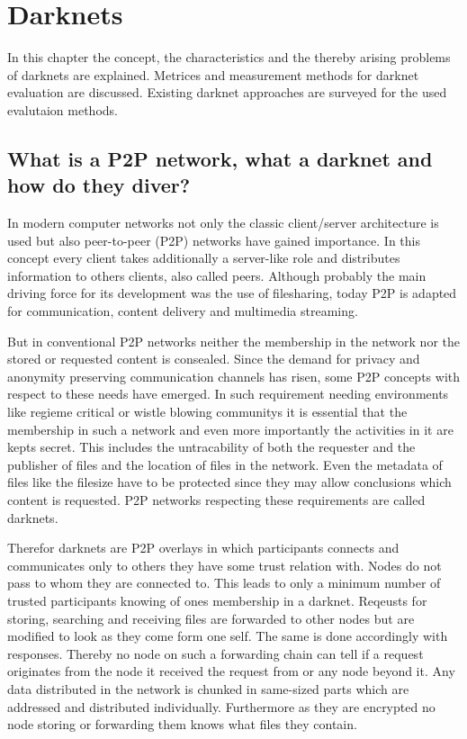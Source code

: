 \chapter{Darknets}

In this chapter the concept, the characteristics and the thereby arising problems of darknets are explained. Metrices and measurement methods for darknet evaluation are discussed. Existing darknet approaches are surveyed for the used evalutaion methods. 

\section{What is a P2P network, what a darknet and how do they diver?}

In modern computer networks not only the classic client/server architecture is used but also peer-to-peer (P2P) networks have gained importance. In this concept every client takes additionally a server-like role and distributes information to others clients, also called peers. Although probably the main driving force for its development was the use of filesharing, today P2P is adapted for communication, content delivery and multimedia streaming.

But in conventional P2P networks neither the membership in the network nor the stored or requested content is consealed. Since the demand for privacy and anonymity preserving communication channels has risen, some P2P concepts with respect to these needs have emerged. In such requirement needing environments like regieme critical or wistle blowing communitys it is essential that the membership in such a network and even more importantly the activities in it are kepts secret. This includes the untracability of both the requester and the publisher of files and the location of files in the network. Even the metadata of files like the filesize have to be protected since they may allow conclusions which content is requested. P2P networks respecting these requirements are called darknets.

Therefor darknets are P2P overlays in which participants connects and communicates only to others they have some trust relation with. Nodes do not pass to whom they are connected to. This leads to only a minimum number of trusted participants knowing of ones membership in a darknet. Reqeusts for storing, searching and receiving files are forwarded to other nodes but are modified to look as they come form one self. The same is done accordingly with responses. Thereby no node on such a forwarding chain can tell if a request originates from the node it received the request from or any node beyond it. Any data distributed in the network is chunked in same-sized parts which are addressed and distributed individually. Furthermore as they are encrypted no node storing or forwarding them knows what files they contain.

